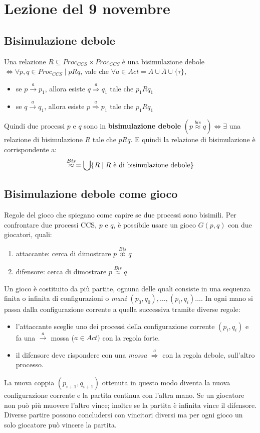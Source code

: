 \section{Lezione del 9 novembre}
\subsection{Bisimulazione debole}

Una relazione $R\subseteq Proc_{CCS}\times Proc_{CCS}$ è una bisimulazione debole $\iff \forall p,q \in Proc_{CCS} \; | \; pRq$, vale che $\forall a\in Act = A \cup \bar{A} \cup \{\tau\}$,
\begin{itemize}
    \item se $p\stackrel{a}{\rightarrow}p_1$, allora esiste $q\stackrel{a}{\Rightarrow}q_1$ tale che $p_1Rq_1$
    \item se $q\stackrel{a}{\rightarrow}q_1$, allora esiste $p\stackrel{a}{\Rightarrow}p_1$ tale che $p_1Rq_1$
\end{itemize}

Quindi due processi $p$ e $q$ sono in \textbf{bisimulazione debole} $(p\stackrel{bis}{\approx}q) \iff \exists$ una relazione di bisimulazione $R$ tale che $pRq$. E quindi la relazione di bisimulazione è corrispondente a:
$$\stackrel{Bis}{\approx} =\bigcup\{R \; | \; R\textnormal{ è di bisimulazione debole} \}$$

\subsection{Bisimulazione debole come gioco} 
Regole del gioco che spiegano come capire se due processi sono bisimili. Per confrontare due processi CCS, $p$ e $q$, è possibile usare un gioco $G(p,q)$ con due giocatori, quali:
\begin{enumerate}
    \item attaccante: cerca di dimostrare $p\stackrel{Bis}{\not\approx}q$
    \item difensore: cerca di dimostrare $p\stackrel{Bis}{\approx}q$
\end{enumerate}
Un gioco è costituito da più partite, ognuna delle quali consiste in una sequenza finita o infinita di configurazioni o \textit{mani} $(p_0,q_0), \dots, (p_i,q_i) \dots$.
In ogni mano si passa dalla configurazione corrente a quella successiva tramite diverse regole:
\begin{itemize}
    \item l’attaccante sceglie uno dei processi della configurazione corrente $(p_i,q_i)$ e fa una $\stackrel{a}{\rightarrow}$ mossa ($a \in Act)$ con la regola forte.
    \item il difensore deve rispondere con una \textit{mossa} $\stackrel{a}{\Rightarrow}$ con la regola debole, sull’altro processo.
\end{itemize}
La nuova coppia $(p_{i+1},q_{i+1})$ ottenuta in questo modo diventa la nuova configurazione corrente e la partita continua con l’altra mano. Se un giocatore non può più muovere l’altro vince; inoltre se la partita è infinita vince il difensore.
Diverse partire possono concludersi con vincitori diversi ma per ogni gioco un solo giocatore può vincere la partita. 

